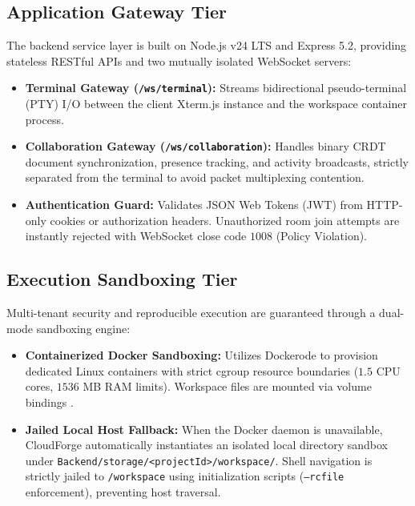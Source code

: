 \documentclass[conference]{IEEEtran}
\begin{document}
\subsection{Application Gateway Tier}
The backend service layer is built on Node.js v24 LTS and Express 5.2, providing stateless RESTful APIs and two mutually isolated WebSocket servers:
\begin{itemize}
    \item \textbf{Terminal Gateway (\texttt{/ws/terminal}):} Streams bidirectional pseudo-terminal (PTY) I/O between the client Xterm.js instance and the workspace container process.
    \item \textbf{Collaboration Gateway (\texttt{/ws/collaboration}):} Handles binary CRDT document synchronization, presence tracking, and activity broadcasts, strictly separated from the terminal to avoid packet multiplexing contention.
    \item \textbf{Authentication Guard:} Validates JSON Web Tokens (JWT) from HTTP-only cookies or authorization headers. Unauthorized room join attempts are instantly rejected with WebSocket close code $1008$ (Policy Violation).
\end{itemize}

\subsection{Execution Sandboxing Tier}
Multi-tenant security and reproducible execution are guaranteed through a dual-mode sandboxing engine:
\begin{itemize}
    \item \textbf{Containerized Docker Sandboxing:} Utilizes Dockerode to provision dedicated Linux containers with strict cgroup resource boundaries ($1.5$ CPU cores, $1536$ MB RAM limits). Workspace files are mounted via volume bindings \cite{merkel2014}.
    \item \textbf{Jailed Local Host Fallback:} When the Docker daemon is unavailable, CloudForge automatically instantiates an isolated local directory sandbox under \texttt{Backend/storage/<projectId>/workspace/}. Shell navigation is strictly jailed to \texttt{/workspace} using initialization scripts (\texttt{--rcfile} enforcement), preventing host traversal.
\end{itemize}
\end{document}
